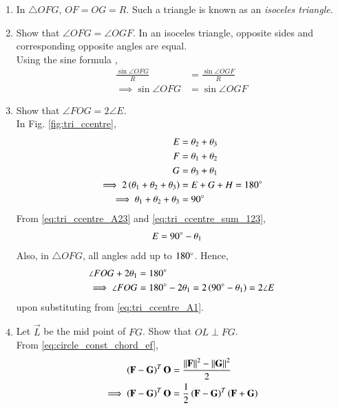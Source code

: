 \begin{enumerate}[label=\thesection.\arabic*.,ref=\thesection.\theenumi]
\item In $\triangle OFG$, $OF=OG = R$.  Such a triangle is known as an {\em isoceles triangle}.
%
\item Show that $\angle OFG = \angle OGF$.  In an isoceles triangle, opposite sides and corresponding opposite angles are equal.
\label{prob:tri_ang_side_eq}
\\
\solution Using the sine formula ,%
\begin{align}
\frac{\sin \angle OFG}{R} &= \frac{\sin \angle OGF}{R}
\\
\implies \sin \angle OFG &= \sin \angle OGF
\end{align}
%
\item  Show that $\angle FOG = 2\angle E$.
\label{prob:tri_ccentre_subtend}
%
\\
\solution In Fig. \ref{fig:tri_ccentre}, 
%
\begin{align}
%
\label{eq:tri_ccentre_A23}
E &= \theta_2+\theta_3
\\
F &= \theta_1+\theta_2
\\
G &= \theta_3+\theta_1
\\
\implies 2\brak{\theta_1+\theta_2+\theta_3} &= E+G+H =180\degree
\\
\implies \theta_1+\theta_2+\theta_3 &= 90\degree
\label{eq:tri_ccentre_sum_123}
\end{align}
%
From \eqref{eq:tri_ccentre_A23} and \eqref{eq:tri_ccentre_sum_123},
%
\begin{align}
%
\label{eq:tri_ccentre_A1}
E &= 90\degree - \theta_1
\end{align}
%
Also, in $\triangle OFG$, all angles add up to $180\degree$.  Hence, 
%
\begin{align}
\angle FOG + 2\theta_1 &= 180\degree
\\
\implies \angle FOG &= 180\degree - 2\theta_1 = 2 \left(90\degree - \theta_1\right)
= 2\angle E
\end{align}
%
upon substituting from \eqref{eq:tri_ccentre_A1}.
%
\item Let $\vec{L}$ be the mid point of $FG$.  Show that $OL \perp FG$.
\label{prob:tri_perp_bisect}
%
\\
\solution From \eqref{eq:circle_const_chord_ef}, 
%
\begin{align}
\brak{\vec{F}-\vec{G}}^T\vec{O} &=   \frac{\norm{\vec{F}}^2- \norm{\vec{G}}^2}{2}
\\
\implies \brak{\vec{F}-\vec{G}}^T\vec{O} &=   \frac{1}{2}\brak{\vec{F}- \vec{G}}^T\brak{\vec{F}+ \vec{G}}
\\

\end{align}
\end{enumerate}
